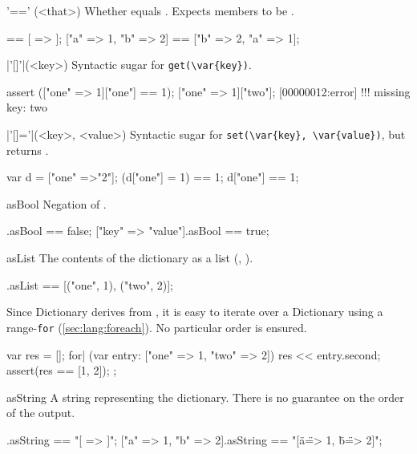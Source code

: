 \begin{urbiscriptapi}
\item['=='](<that>)%
  Whether \this equals .  Expects members to be
  .
\begin{urbiassert}
[ => ] == [ => ];
["a" => 1, "b" => 2] == ["b" => 2, "a" => 1];
\end{urbiassert}


\item|'[]'|(<key>)%
  Syntactic sugar for \lstinline|get(\var{key})|.

\begin{urbiscript}
assert (["one" => 1]["one"] == 1);
["one" => 1]["two"];
[00000012:error] !!! missing key: two
\end{urbiscript}


\item|'[]='|(<key>, <value>)%
  Syntactic sugar for \lstinline|set(\var{key}, \var{value})|, but returns
  .

\begin{urbiassert}
var d = ["one" =>"2"];
(d["one"] = 1) == 1;
d["one"] == 1;
\end{urbiassert}


\item[asBool]
  Negation of .
\begin{urbiassert}
[=>].asBool == false;
["key" => "value"].asBool == true;
\end{urbiassert}


\item[asList]%
  The contents of the dictionary as a  list (,
  ).

\begin{urbiassert}
["one" => 1, "two" => 2].asList == [("one", 1), ("two", 2)];
\end{urbiassert}

  \noindent
  Since Dictionary derives from , it is easy to
  iterate over a Dictionary using a range-\lstinline|for|
  (\autoref{sec:lang:foreach}).  No particular order is ensured.
\begin{urbiscript}
{
  var res = [];
  for| (var entry: ["one" => 1, "two" => 2])
    res << entry.second;
  assert(res == [1, 2]);
};
\end{urbiscript}


\item[asString] A string representing the dictionary.  There is no guarantee
  on the order of the output.
\begin{urbiassert}
                [=>].asString == "[ => ]";
["a" => 1, "b" => 2].asString == "[\"a\" => 1, \"b\" => 2]";
\end{urbiassert}



\end{urbiscriptapi}
